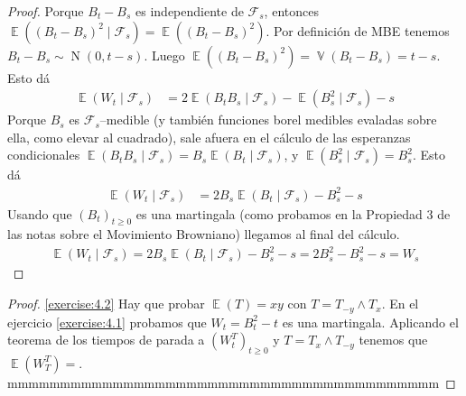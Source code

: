 \documentclass{article}
\DeclareMathOperator{\Expectation}{\mathbb{E}}
\DeclareMathOperator{\Variance}{\mathbb{V}}
\DeclareMathOperator{\normal}{N}
\newcommand{\brownian}{B}
\newcommand{\wiener}{W}
\newcommand{\events}{\mathcal{F}}
\theoremstyle{definition}
\begin{document}
\begin{proof}
Porque \(\brownian_t - \brownian_s\) es independiente de \(\events_s\), entonces \(\Expectation \left( (\brownian_t - \brownian_s)^2 \mid \events_s \right) = \Expectation \left( (\brownian_t - \brownian_s)^2\right)\).
Por definición de MBE tenemos \(\brownian_t - \brownian_s \sim \normal(0, t - s)\).
Luego \(\Expectation \left( (\brownian_t - \brownian_s)^2\right) = \Variance(\brownian_t - \brownian_s)= t - s\).
Esto dá
\begin{align}
	\Expectation(\wiener_t \mid \events_s)
	&= 
	2 \Expectation \left( \brownian_t \brownian_s \mid \events_s \right) 
	- \Expectation \left( \brownian_s^2 \mid \events_s \right) 
	- s
\end{align}
Porque \(B_s\) es \(\events_s\)--medible (y también funciones borel medibles evaladas sobre ella, como elevar al cuadrado), sale afuera en el cálculo de las esperanzas condicionales \(\Expectation \left( \brownian_t \brownian_s \mid \events_s \right) = \brownian_s \Expectation \left( \brownian_t \mid \events_s \right)\), y \(\Expectation \left( \brownian_s^2 \mid \events_s \right) = \brownian_s^2\).
Esto dá
\begin{align}
	\Expectation(\wiener_t \mid \events_s)
	&= 
	2 \brownian_s \Expectation \left( \brownian_t \mid \events_s \right) 
	- \brownian_s^2 
	- s
\end{align}
Usando que \((\brownian_t)_{t \geq 0}\) es una martingala (como probamos en la Propiedad 3 de las notas sobre el Movimiento Browniano) llegamos al final del cálculo.
\begin{align}
	\Expectation(\wiener_t \mid \events_s)
	= 
	2 \brownian_s \Expectation \left( \brownian_t \mid \events_s \right) 
	- \brownian_s^2 
	- s
	=
	2 \brownian_s^2 - \brownian_s^2 - s
	=
	\wiener_s
\end{align}
\end{proof}
\begin{proof} \ref{exercise:4.2}
Hay que probar \(\Expectation(T) = xy\) con \(T = T_{- y} \wedge T_x\).
En el ejercicio \ref{exercise:4.1} probamos que \(\wiener_t = \brownian_t^2 - t\) es una martingala.
Aplicando el teorema de los tiempos de parada a	\((\wiener^T_t)_{t \geq 0}\) y \(T = T_x \wedge T_{- y}\) tenemos que \(\Expectation(\wiener^T_T) = \).
mmmmmmmmmmmmmmmmmmmmmmmmmmmmmmmmmmmmmmmmm
\end{proof}
\end{document}
